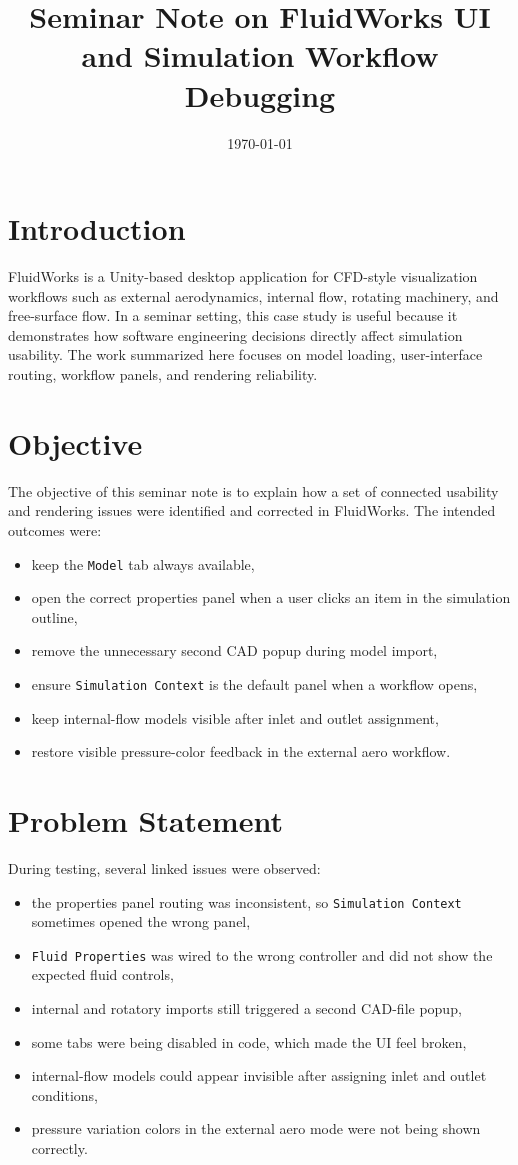 \documentclass[11pt,a4paper]{article}
\title{Seminar Note on FluidWorks UI and Simulation Workflow Debugging}
\author{}
\date{\today}
\begin{document}
\maketitle

\section{Introduction}
FluidWorks is a Unity-based desktop application for CFD-style visualization workflows such as external aerodynamics, internal flow, rotating machinery, and free-surface flow. In a seminar setting, this case study is useful because it demonstrates how software engineering decisions directly affect simulation usability. The work summarized here focuses on model loading, user-interface routing, workflow panels, and rendering reliability.

\section{Objective}
The objective of this seminar note is to explain how a set of connected usability and rendering issues were identified and corrected in FluidWorks. The intended outcomes were:
\begin{itemize}
  \item keep the \texttt{Model} tab always available,
  \item open the correct properties panel when a user clicks an item in the simulation outline,
  \item remove the unnecessary second CAD popup during model import,
  \item ensure \texttt{Simulation Context} is the default panel when a workflow opens,
  \item keep internal-flow models visible after inlet and outlet assignment,
  \item restore visible pressure-color feedback in the external aero workflow.
\end{itemize}

\section{Problem Statement}
During testing, several linked issues were observed:
\begin{itemize}
  \item the properties panel routing was inconsistent, so \texttt{Simulation Context} sometimes opened the wrong panel,
  \item \texttt{Fluid Properties} was wired to the wrong controller and did not show the expected fluid controls,
  \item internal and rotatory imports still triggered a second CAD-file popup,
  \item some tabs were being disabled in code, which made the UI feel broken,
  \item internal-flow models could appear invisible after assigning inlet and outlet conditions,
  \item pressure variation colors in the external aero mode were not being shown correctly.
\end{itemize}
\end{document}

